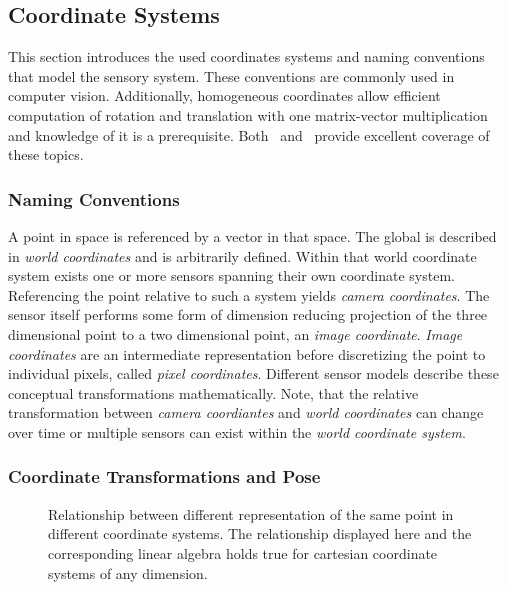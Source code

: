 \subsection{Coordinate Systems}

This section introduces the used coordinates systems and naming conventions that model the sensory system.
These conventions are commonly used in computer vision.
Additionally, homogeneous coordinates allow efficient computation of rotation and translation with one matrix-vector multiplication and knowledge of it is a prerequisite.
Both~\cite{hartley_2004} and~\cite{corke_2011} provide excellent coverage of these topics.

\subsubsection*{Naming Conventions}

A point in space is referenced by a vector in that space.
The global is described in \emph{world coordinates} and is arbitrarily defined.
Within that world coordinate system exists one or more sensors spanning their own coordinate system.
Referencing the point relative to such a system yields \emph{camera coordinates}.
The sensor itself performs some form of dimension reducing projection of the three dimensional point to a two dimensional point, an \emph{image coordinate}.
\emph{Image coordinates} are an intermediate representation before discretizing the point to individual pixels, called \emph{pixel coordinates}.
Different sensor models describe these conceptual transformations mathematically.
Note, that the relative transformation between \emph{camera coordiantes} and \emph{world coordinates} can change over time or multiple sensors can exist within the \emph{world coordinate system}.

\subsubsection*{Coordinate Transformations and Pose}

\begin{figure}[H]
    
    \caption[Coordinate Transformation]{Relationship between different representation of the same point in different coordinate systems. The relationship displayed here and the corresponding linear algebra holds true for cartesian coordinate systems of any dimension.}
\end{figure}

